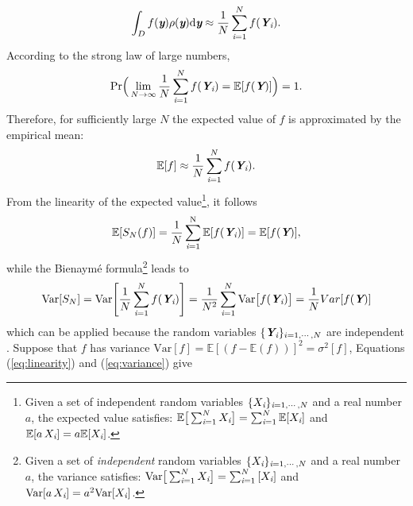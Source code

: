\begin{equation}\label{eq:approx_MC_QMC}
\int_{D}f(\textit{\textbf{y}})\rho(\textit{\textbf{y}}) \textrm{d}\textit{\textbf{y}}\approx\frac{1}{N} \sum_{\textit{i}=1}^{N} f(\textit{\textbf{Y}}_{\textit{i}}).
\end{equation}
According to the strong law of large numbers,
\begin{equation}
\textrm{Pr}\Big(\lim_{N\rightarrow\infty}\frac{1}{N}\sum_{\textit{i}=1}^{N} f(\textit{\textbf{Y}}_{\textit{i}}) = \mathbb{E}[f(\textit{\textbf{Y}})] \Big) = 1.
\end{equation}
Therefore, for sufficiently large $N$ the expected value of $f$ is approximated by the empirical mean:
\begin{equation}
\mathbb{E}[f] \approx \frac{1}{N} \sum_{\textit{i}=1}^{N} f(\textit{\textbf{Y}}_{\textit{i}}).
\end{equation}
From the linearity of the expected value\footnote{Given a set of independent random variables $\{X_{\textit{i}}\}_{\textit{i}=1, \cdots, N}$ and a real number $a$, the expected value satisfies:
$\mathbb{E}\big[\sum_{\textit{i}=1}^{N}X_{\textit{i}}\big] = \sum_{\textit{i}=1}^{N}\mathbb{E}[X_{\textit{i}}]$ and $\mathbb{E}[a\,X_{\textit{i}}] = a\mathbb{E}[X_{\textit{i}}]$.},
 it follows
\begin{equation}\label{eq:linearity}
\mathbb{E}[S_{N}(f)] = \frac{1}{N}\sum_{\textit{i}=1}^{\textrm{N}}\mathbb{E}[f(\textit{\textbf{Y}}_{\textit{i}})] = \mathbb{E}[f(\textit{\textbf{Y}})],
\end{equation}
while the Bienaym\'e formula\footnote{Given a set of \textit{independent} random variables $\{X_{\textit{i}}\}_{\textit{i}=1, \cdots, N}$ and a real number $a$, the variance satisfies:
$\textrm{Var}\big[\sum_{\textit{i}=1}^{N}X_{\textit{i}}\big] = \sum_{\textit{i}=1}^{N}\textrm[X_{\textit{i}}]$ and $\textrm{Var}[a\,X_{\textit{i}}] = a^2\textrm{Var}[X_{\textit{i}}]$.} leads to
\begin{equation}\label{eq:variance}
\textrm{Var}[S_{N}]= \textrm{Var}\Bigg[\frac{1}{N}\sum_{\textit{i}=1}^{N}f(\textit{\textbf{Y}}_{\textit{i}})\Bigg] =
 \frac{1}{N^2}\sum_{\textit{i}=1}^{N}\textrm{Var}\big[f(\textit{\textbf{Y}}_{\textit{i}})\big] = \frac{1}{N}Var[f(\textit{\textbf{Y}})]
\end{equation}
which can be applied because the random variables $\{\textit{\textbf{Y}}_{\textit{i}}\}_{i = 1, \cdots, N}$ are independent \cite{grinstead2012introduction}. 
Suppose that $f$ has variance $\textrm{Var}[f]=\mathbb{E}[(f-\mathbb{E}(f))]^2 = \sigma^2[f] $, Equations (\ref{eq:linearity}) and (\ref{eq:variance}) give
